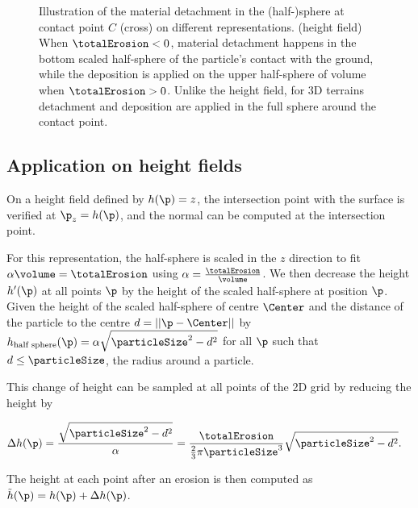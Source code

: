 \begin{figure}
    \caption[Erosion and deposition of a particle on different terrain representations]{Illustration of the material detachment in the (half-)sphere at contact point $C$ (cross) on different representations. (height field) When $\totalErosion < 0$, material detachment happens in the bottom scaled half-sphere of the particle's contact with the ground, while the deposition is applied on the upper half-sphere of volume when $\totalErosion > 0$. Unlike the height field, for 3D terrains detachment and deposition are applied in the full sphere around the contact point.}
    \label{fig:erosion-erosion-heightfield}
\end{figure}

\subsection{Application on height fields}
\label{sec:erosion-application_on_heightmaps}

On a height field defined by $h(\p) = z$, the intersection point with the surface is verified at $\p_z = h(\p)$, and the normal can be computed at the intersection point. 

For this representation, the half-sphere is scaled in the $z$ direction to fit $\alpha \volume = \totalErosion$ using $\alpha = \frac{\totalErosion}{\volume}$. We then decrease the height $h'(\p)$ at all points $\p$ by the height of the scaled half-sphere at position $\p$. Given the height of the scaled half-sphere of centre $\Center$ and the distance of the particle to the centre $d = ||\p - \Center||$ by $h_\text{half sphere}(\p) = \alpha \sqrt{\particleSize^2 - d^2}$ for all $\p$ such that $d \leq \particleSize$, the radius around a particle.

This change of height can be sampled at all points of the 2D grid by reducing the height by 

\begin{align} 
    \label{eq:erosion-erosionHeightfield}
    \Delta h(\p) &= \frac{\sqrt{\particleSize^2 - d^2}}{\alpha} = \frac{\totalErosion}{\frac{2}{3} \pi \particleSize^3} \sqrt{\particleSize^2 - d^2}.
\end{align}

The height at each point after an erosion is then computed as $\Tilde{h}(\p) = h(\p) + \Delta h(\p)$.


